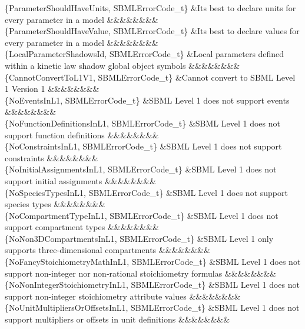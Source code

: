 \begin{DoxyParagraph}{}
\begin{longtabu}
\{Parameter\+Should\+Have\+Units, S\+B\+M\+L\+Error\+Code\+\_\+t\} &It\textquotesingle{}s best to declare units for every parameter in a model &&&&&&&&\\
\{Parameter\+Should\+Have\+Value, S\+B\+M\+L\+Error\+Code\+\_\+t\} &It\textquotesingle{}s best to declare values for every parameter in a model &&&&&&&&\\
\{Local\+Parameter\+Shadows\+Id, S\+B\+M\+L\+Error\+Code\+\_\+t\} &Local parameters defined within a kinetic law shadow global object symbols &&&&&&&&\\
\{Cannot\+Convert\+To\+L1\+V1, S\+B\+M\+L\+Error\+Code\+\_\+t\} &Cannot convert to S\+B\+ML Level 1 Version 1 &&&&&&&&\\
\{No\+Events\+In\+L1, S\+B\+M\+L\+Error\+Code\+\_\+t\} &S\+B\+ML Level 1 does not support events &&&&&&&&\\
\{No\+Function\+Definitions\+In\+L1, S\+B\+M\+L\+Error\+Code\+\_\+t\} &S\+B\+ML Level 1 does not support function definitions &&&&&&&&\\
\{No\+Constraints\+In\+L1, S\+B\+M\+L\+Error\+Code\+\_\+t\} &S\+B\+ML Level 1 does not support constraints &&&&&&&&\\
\{No\+Initial\+Assignments\+In\+L1, S\+B\+M\+L\+Error\+Code\+\_\+t\} &S\+B\+ML Level 1 does not support initial assignments &&&&&&&&\\
\{No\+Species\+Types\+In\+L1, S\+B\+M\+L\+Error\+Code\+\_\+t\} &S\+B\+ML Level 1 does not support species types &&&&&&&&\\
\{No\+Compartment\+Type\+In\+L1, S\+B\+M\+L\+Error\+Code\+\_\+t\} &S\+B\+ML Level 1 does not support compartment types &&&&&&&&\\
\{No\+Non3\+D\+Compartments\+In\+L1, S\+B\+M\+L\+Error\+Code\+\_\+t\} &S\+B\+ML Level 1 only supports three-\/dimensional compartments &&&&&&&&\\
\{No\+Fancy\+Stoichiometry\+Math\+In\+L1, S\+B\+M\+L\+Error\+Code\+\_\+t\} &S\+B\+ML Level 1 does not support non-\/integer nor non-\/rational stoichiometry formulas &&&&&&&&\\
\{No\+Non\+Integer\+Stoichiometry\+In\+L1, S\+B\+M\+L\+Error\+Code\+\_\+t\} &S\+B\+ML Level 1 does not support non-\/integer \textquotesingle{}stoichiometry\textquotesingle{} attribute values &&&&&&&&\\
\{No\+Unit\+Multipliers\+Or\+Offsets\+In\+L1, S\+B\+M\+L\+Error\+Code\+\_\+t\} &S\+B\+ML Level 1 does not support multipliers or offsets in unit definitions &&&&&&&&\\

\end{longtabu}
\end{DoxyParagraph}

